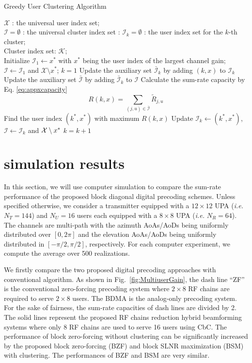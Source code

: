 \documentclass[conference]{IEEEtran}
\begin{document}
{\begin{algorithm}[h] 		
	\caption{Greedy User Clustering Algorithm}
	\label{beam_cluster}
	\begin{algorithmic}[1]
		\REQUIRE  \quad
		\STATE	$\mathcal{X}$ : the universal user index set; \\
		\STATE 	$\bm{\mathcal{I}}=\emptyset$ : the universal cluster index set :
		\STATE  $\mathcal{I}_k=\emptyset$ : the user index set for the $k$-th cluster;\\
		\STATE  Cluster index set: $\mathcal{K}$;\\
		\STATE Initialize $\mathcal{I}_1 \leftarrow  x^*$ with $x^*$ being the user index of the largest channel gain;
\STATE $\bm{\mathcal{I}} \leftarrow \mathcal{I}_1$ and ${\mathcal X}\setminus x^*$;
		\ENSURE   	
		\STATE $k=1$
		\STATE  Update the auxiliary set $\bar{{\mathcal{I}}}_k$ by adding $(k,x)$ to $\mathcal{I}_k$
		\STATE  Update the auxiliary set $\bar{\bm{\mathcal{I}}}$ by adding $\bar{\mathcal{I}}_k$ to ${\bm{\mathcal{I}}}$
		\STATE Calculate the sum-rate capacity by Eq. \eqref{eq:appxcapacity} $${R}(k,x)= \sum_{(j,u)\in \bar{\bm{\mathcal{I}}}} \tilde{R}_{j,u}$$
		\ENDFOR
		\STATE Find the user index $(k^*,x^*)$ with maximum $R(k,x)$
		\STATE Update $\mathcal{I}_{k}\leftarrow (k^*, x^*)$, $\bm{\mathcal{I}}\leftarrow \mathcal{I}_k$ and  ${\cal X}\setminus x^*$
		\STATE $k=k+1$
		\ENDIF
		\ENDWHILE
	\end{algorithmic}
\end{algorithm}

\section{simulation results}
In this section, we will use computer simulation to compare the sum-rate performance of the proposed block diagonal digital precoding schemes. Unless specified otherwise, we consider a transmitter equipped with a $12\times 12$ UPA ({\em i.e.} $N_T=144$) and $N_U=16$ users each equipped with a $8\times 8$ UPA ({\em i.e.} $N_R=64$). The channels are multi-path with the azimuth AoAs/AoDs being uniformly distributed over $[0, 2\pi]$ and the elevation AoAs/AoDs being uniformly distributed in $[-\pi/2, \pi/2]$, respectively. For each computer experiment, we compute the average over 500 realizations.

We firstly compare the two proposed digital precoding approaches with conventional algorithm. As shown in Fig.~\ref{fig:MultiuserGain}, the dash line ``ZF'' is the conventional zero-forcing precoding system where $2\times 8$ RF chains are required to serve $2\times 8$ users.  The BDMA is the analog-only precoding system. For the sake of fairness, the sum-rate capacities of dash lines are divided by 2. The solid lines represent the proposed RF chains reduction hybrid beamforming systems where only 8 RF chains are used to serve 16 users using CbC. The performance of block zero-forcing without clustering can be significantly increased by the proposed block zero-forcing (BZF) and block SLNR maximization (BSM) with clustering. The performances of BZF and BSM are very similar.

}
\end{document}
